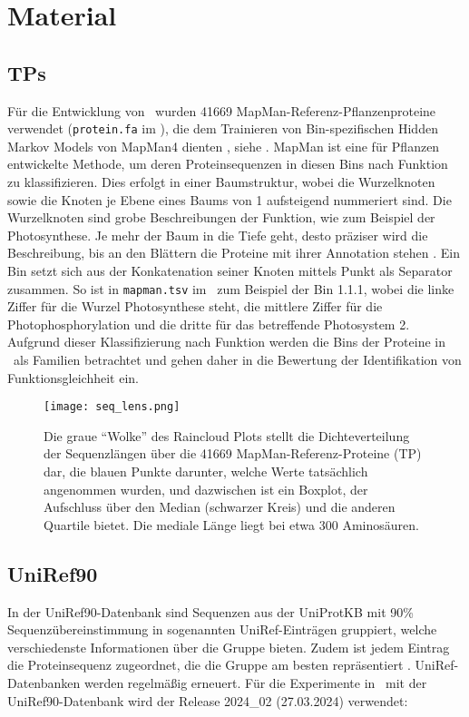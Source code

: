 \section{Material} %
\label{sec:material}
    \subsection{\aclp{TP}} %
        \label{sub:mapman}
        Für die Entwicklung von \protfin\ wurden 41669 MapMan-Referenz-Pflanzenproteine verwendet (\texttt{protein.fa} im \Anhang), die dem Trainieren von Bin-spezifischen Hidden Markov Models von MapMan4 dienten \autocite{mapman}, siehe \Anhang. MapMan ist eine für Pflanzen entwickelte Methode, um deren Proteinsequenzen in diesen Bins nach Funktion zu klassifizieren. Dies erfolgt in einer Baumstruktur, wobei die Wurzelknoten sowie die Knoten je Ebene eines Baums von 1 aufsteigend nummeriert sind. Die Wurzelknoten sind grobe Beschreibungen der Funktion, wie zum Beispiel der Photosynthese. Je mehr der Baum in die Tiefe geht, desto präziser wird die Beschreibung, bis an den Blättern die Proteine mit ihrer Annotation stehen \autocite{mapman}\autocite{mapman}. Ein Bin setzt sich aus der Konkatenation seiner Knoten mittels Punkt als Separator zusammen. So ist in \texttt{mapman.tsv} im \Anhang\ zum Beispiel der Bin 1.1.1, wobei die linke Ziffer für die Wurzel Photosynthese steht, die mittlere Ziffer für die Photophosphorylation und die dritte für das betreffende Photosystem 2. Aufgrund dieser Klassifizierung nach Funktion werden die Bins der Proteine in \protfin\ als Familien betrachtet und gehen daher in die Bewertung der Identifikation von Funktionsgleichheit ein.

        \begin{figure}[H]
            \texttt{[image: seq\_lens.png]}
            \caption[Raincloud Plot der \acl{TP} Sequenzlängen]{Die graue ``Wolke'' des Raincloud Plots stellt die Dichteverteilung der Sequenzlängen über die 41669 MapMan-Referenz-Proteine (\acl{TP}) dar, die blauen Punkte darunter, welche Werte tatsächlich angenommen wurden, und dazwischen ist ein Boxplot, der Aufschluss über den Median (schwarzer Kreis) und die anderen Quartile bietet. Die mediale Länge liegt bei etwa 300 Aminosäuren.}
            \label{fig:sequences}
        \end{figure}

    \subsection{UniRef90} %
        \label{sub:uniref90}
        In der UniRef90-Datenbank sind Sequenzen aus der UniProtKB \autocite{uniprot} mit 90\% Sequenzübereinstimmung in sogenannten UniRef-Einträgen gruppiert, welche verschiedenste Informationen über die Gruppe bieten. Zudem ist jedem Eintrag die Proteinsequenz zugeordnet, die die Gruppe am besten repräsentiert \autocite{uniref}. UniRef-Datenbanken werden regelmäßig erneuert. Für die Experimente in \protfin\ mit der UniRef90-Datenbank wird der Release 2024\_02 (27.03.2024) verwendet:

